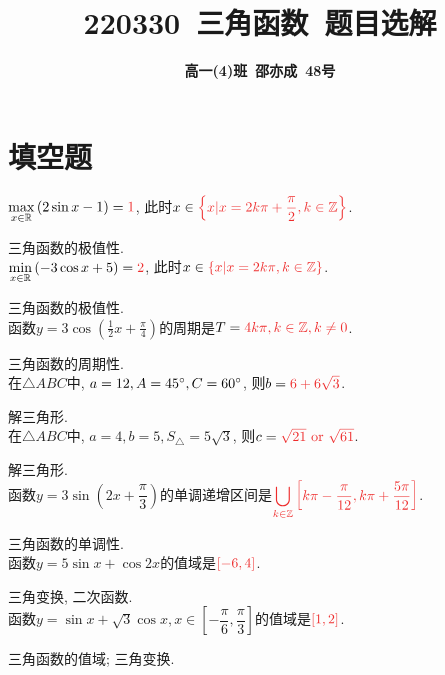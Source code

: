 \documentclass[8pt]{article}
\author{\normalfont\sffamily\large\bfseries{高一(4)班\ 邵亦成\ 48号}}
\title{\normalfont\sffamily\huge\bfseries{\textcolor{allanblue}{220330}\ \textcolor{allancyan}{三角函数}\ 题目选解}}
\date{}
\begin{document}
	\maketitle

	\section{填空题}
		$\displaystyle \max_{x\in\RR}{\left(2\sin x-1\right)}=\ansmath{1}$, 此时$x\in\ansmath{\left\{x|x=2k\pi+\dfrac{\pi}{2}, k\in\ZZ\right\}}$.

		三角函数的极值性.
		~\\

		$\displaystyle \min_{x\in\RR}{\left(-3\cos x+5\right)}=\ansmath{2}$, 此时$x\in\ansmath{\left\{x|x=2k\pi, k\in\ZZ\right\}}$.

		三角函数的极值性.
		~\\

		函数$\displaystyle y=3\cos\left(\frac{1}{2}x+\frac{\pi}{4}\right)$的周期是$T=\ansmath{4k\pi, k\in\ZZ, k\neq 0}$.

		三角函数的周期性.
		~\\

		在$\triangle ABC$中, $a=12, A=45^\circ, C=60^\circ$, 则$b=\ansmath{6+6\sqrt{3}}$.

		解三角形.
		~\\

		在$\triangle ABC$中, $a=4, b=5, S_{\triangle}=5\sqrt{3}$, 则$c=\ansmath{\sqrt{21} \lgor \sqrt{61}}$.

		解三角形.
		~\\

		函数$y=3\sin\left(2x+\dfrac{\pi}{3}\right)$的单调递增区间是$\displaystyle\ansmath{\bigcup_{k\in\ZZ}{\left[k\pi-\frac{\pi}{12}, k\pi+\frac{5\pi}{12}\right]}}$.

		三角函数的单调性.
		~\\

		函数$y=5\sin x+\cos 2x$的值域是$\ansmath{[-6, 4]}$.

		三角变换, 二次函数.
		~\\

		函数$y=\sin x +\sqrt{3} \cos x, x\in\left[-\dfrac{\pi}{6}, \dfrac{\pi}{3}\right]$的值域是$\ansmath{[1, 2]}$.

		三角函数的值域; 三角变换.
		~\\
\end{document}
